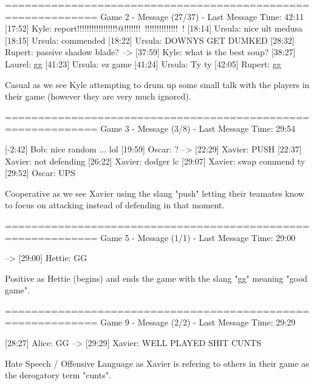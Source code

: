 \documentclass[11pt, letterpaper, notitlepage]{article}
\begin{document}
\begin{python}
============================================================
Game 2 - Message (27/37) - Last Message Time: 42:11
    [17:52] Kyle: report!!!!!!!!!!!!!!!!!@!!!!!!!~!!!!!!!!!!!!!!~!
    [18:14] Ursula: nice ult medusa
    [18:15] Ursula: commended
    [18:22] Ursula: DOWNYS  GET DUMKED
    [28:32] Rupert: passive shadow blade?
--> [37:59] Kyle: what is the best soup?
    [38:27] Laurel: gg
    [41:23] Ursula: ez game
    [41:24] Ursula: Ty ty 
    [42:05] Rupert: gg
    \end{python}
    Casual as we see Kyle attempting to drum up some small talk with the players in their game (however they are very much ignored).
\newpage

\begin{python}
============================================================
Game 3 - Message (3/8) - Last Message Time: 29:54



    [-2:42] Bob: nice random ... lol
    [19:59] Oscar: ?
--> [22:29] Xavier: PUSH
    [22:37] Xavier: not defending
    [26:22] Xavier: dodger lc
    [29:07] Xavier: swap commend ty
    [29:52] Oscar: UPS
\end{python}
Cooperative as we see Xavier using the slang "push" letting their teamates know to focus on attacking instead of defending in that moment.
\vspace{2em}

\begin{python}
============================================================
Game 5 - Message (1/1) - Last Message Time: 29:00





--> [29:00] Hettie: GG
\end{python}
Positive as Hettie (begins) and ends the game with the slang "gg" meaning "good game".
\vspace{2em}

\begin{python}
============================================================
Game 9 - Message (2/2) - Last Message Time: 29:29
    
    
    
    
    [28:27] Alice: GG
--> [29:29] Xavier: WELL PLAYED SHIT CUNTS
\end{python}
Hate Speech / Offensive Language as Xavier is refering to others in their game as the derogatory term "cunts".

\newpage
\end{document}
